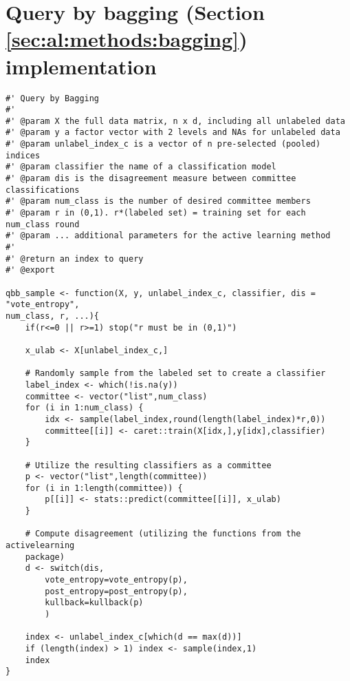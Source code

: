 \section{Query by bagging (Section \ref{sec:al:methods:bagging}) implementation}
\label{sec:appendicies:al:bagging}
{
\begin{lstlisting}
#' Query by Bagging
#'
#' @param X the full data matrix, n x d, including all unlabeled data
#' @param y a factor vector with 2 levels and NAs for unlabeled data
#' @param unlabel_index_c is a vector of n pre-selected (pooled) indices
#' @param classifier the name of a classification model
#' @param dis is the disagreement measure between committee classifications
#' @param num_class is the number of desired committee members
#' @param r in (0,1). r*(labeled set) = training set for each num_class round
#' @param ... additional parameters for the active learning method
#'
#' @return an index to query
#' @export

qbb_sample <- function(X, y, unlabel_index_c, classifier, dis = "vote_entropy", 
num_class, r, ...){
	if(r<=0 || r>=1) stop("r must be in (0,1)")
	
	x_ulab <- X[unlabel_index_c,]
	
	# Randomly sample from the labeled set to create a classifier
	label_index <- which(!is.na(y))
	committee <- vector("list",num_class)
	for (i in 1:num_class) {
		idx <- sample(label_index,round(length(label_index)*r,0))
		committee[[i]] <- caret::train(X[idx,],y[idx],classifier)
	}
	
	# Utilize the resulting classifiers as a committee
	p <- vector("list",length(committee))
	for (i in 1:length(committee)) {
		p[[i]] <- stats::predict(committee[[i]], x_ulab)
	}
	
	# Compute disagreement (utilizing the functions from the activelearning 
	package)
	d <- switch(dis,
		vote_entropy=vote_entropy(p),
		post_entropy=post_entropy(p),
		kullback=kullback(p)
		)
	
	index <- unlabel_index_c[which(d == max(d))]
	if (length(index) > 1) index <- sample(index,1)
	index
}
\end{lstlisting}
}

